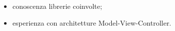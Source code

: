 \begin{itemize}
\item conoscenza librerie coinvolte;
\item esperienza con architetture Model-View-Controller.
\end{itemize}
